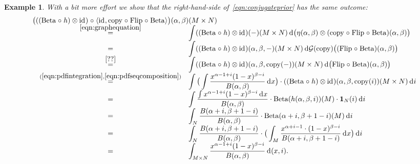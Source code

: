 \documentclass{mscs}
\newcommand{\after}{\mathrel{\circ}}
\newcommand{\idmap}[1][]{\ensuremath{\mathrm{id}_{#1}}}
\newcommand{\Giry}{\mathcal{G}}
\newcommand{\tuple}[1]{\langle#1\rangle}
\newcommand{\intd}{{\kern.2em}\mathrm{d}{\kern.03em}}
\newcommand{\indic}[1]{\mathbf{1}_{#1}}
\newcommand{\betachan}{\ensuremath{\mathrm{Beta}}}
\newcommand{\flipchan}{\ensuremath{\mathrm{Flip}}}
\newcommand{\copychan}{\ensuremath{\mathrm{copy}}}
\newtheorem{example}[theorem]{Example}
\begin{document}
\begin{example}
{\noindent With a bit more effort we show that the right-hand-side
of~\eqref{eqn:conjugateprior} has the same outcome:
\[ \begin{array}{rcl}
\lefteqn{\big(((\betachan \after h)\otimes\idmap) \after
   \tuple{\idmap, \copychan \after \flipchan \after \betachan}\big)
   (\alpha, \beta)(M\times N)}
\\
& \smash{\stackrel{\eqref{eqn:graphequation}}{=}} &
\displaystyle \int ((\betachan \after h)\otimes\idmap)(-)(M\times N)
   \intd \big(\eta(\alpha,\beta) \otimes 
    (\copychan \after \flipchan \after \betachan)(\alpha,\beta)\big)
\\
& = &
\displaystyle \int ((\betachan \after h)\otimes\idmap)(\alpha, \beta, -)
   (M\times N)   \intd 
   \Giry(\copychan)\big((\flipchan \after \betachan)(\alpha,\beta)\big)
\\
& \smash{\stackrel{\eqref{??}}{=}} &
\displaystyle \int ((\betachan \after h)\otimes\idmap)(\alpha, \beta, 
   \copychan(-))(M\times N)   \intd 
   \big(\flipchan \after \betachan)(\alpha,\beta)\big)
\\
& \smash{\stackrel{(\ref{eqn:pdfintegration},
     \ref{eqn:pdfseqcomposition})}{=}} &
\displaystyle \int \big(\int \frac{x^{\alpha-1+i}(1-x)^{\beta-i}}
   {B(\alpha,\beta)}\intd x\big) \cdot
   ((\betachan \after h)\otimes\idmap)(\alpha, \beta, 
   \copychan(i))(M\times N) \intd i
\\
& = &
\displaystyle \int \frac{\int x^{\alpha-1+i}(1-x)^{\beta-i} \intd x}
   {B(\alpha,\beta)} \cdot
   \betachan(h(\alpha, \beta, i))(M) \cdot \indic{N}(i) \intd i
\\
& = &
\displaystyle \int_{N} \frac{B(\alpha+i, \beta+1-i)}{B(\alpha,\beta)} \cdot
   \betachan(\alpha+i, \beta+1-i)(M) \intd i
\\
& = &
\displaystyle \int_{N} \frac{B(\alpha+i, \beta+1-i)}{B(\alpha,\beta)} \cdot
   \big(\int_{M} \frac{x^{\alpha+i-1}\cdot (1-x)^{\beta-i}}{B(\alpha+i, \beta+1-i)}
   \intd x\big) \intd i
\\
& = &
\displaystyle \int_{M\times N} \frac{x^{\alpha-1+i}(1-x)^{\beta-i}}
   {B(\alpha,\beta)} \intd (x,i).
\end{array} \]
}
\end{example}
\end{document}
